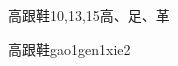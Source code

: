 \begin{entry}{高跟鞋}{10,13,15}{⾼、⾜、⾰}
  \begin{phonetics}{高跟鞋}{gao1gen1xie2}
  \end{phonetics}
\end{entry}
